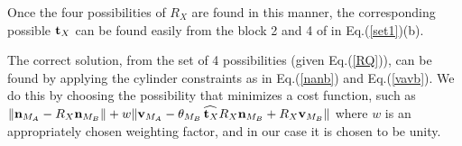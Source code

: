 \documentclass[twocolumn,10pt]{asme2ej}
\newtheorem{theorem}{Theorem}[section]
\begin{document}
Once the four possibilities of $R_X$ are found in this manner, the corresponding possible ${\bf t}_X$ can be found easily from the block 2 and 4 of in Eq.(\ref{set1})(b).

The correct solution, from the set of 4 possibilities (given Eq.(\ref{RQ})), can be found by applying the cylinder constraints as in Eq.(\ref{nanb}) and Eq.(\ref{vavb}). We do this by choosing the possibility that minimizes a cost function, such as $\| {\bf n}_{M_A}-R_X {\bf n}_{M_B} \|+w \| {\bf v}_{M_A} - \theta_{M_B} \widehat{\,{\bf t}_X} R_X {\bf n}_{M_B} + R_X {\bf v}_{M_B} \|$
where $w$ is an appropriately chosen weighting factor, and in our case it is chosen to be unity.

\end{document}
